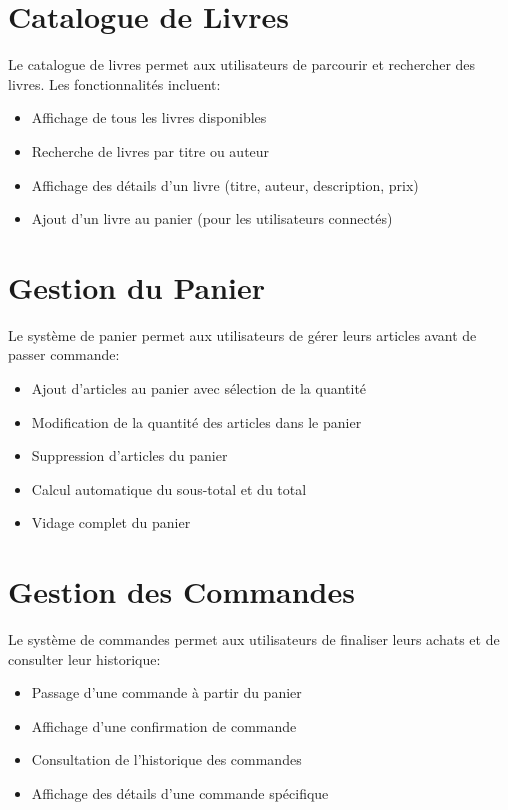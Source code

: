 \documentclass[12pt,a4paper]{report}
\begin{document}
\section{Catalogue de Livres}
Le catalogue de livres permet aux utilisateurs de parcourir et rechercher des livres. Les fonctionnalités incluent:

\begin{itemize}
    \item Affichage de tous les livres disponibles
    \item Recherche de livres par titre ou auteur
    \item Affichage des détails d'un livre (titre, auteur, description, prix)
    \item Ajout d'un livre au panier (pour les utilisateurs connectés)
\end{itemize}

\section{Gestion du Panier}
Le système de panier permet aux utilisateurs de gérer leurs articles avant de passer commande:

\begin{itemize}
    \item Ajout d'articles au panier avec sélection de la quantité
    \item Modification de la quantité des articles dans le panier
    \item Suppression d'articles du panier
    \item Calcul automatique du sous-total et du total
    \item Vidage complet du panier
\end{itemize}

\section{Gestion des Commandes}
Le système de commandes permet aux utilisateurs de finaliser leurs achats et de consulter leur historique:

\begin{itemize}
    \item Passage d'une commande à partir du panier
    \item Affichage d'une confirmation de commande
    \item Consultation de l'historique des commandes
    \item Affichage des détails d'une commande spécifique
\end{itemize}
\end{document}

